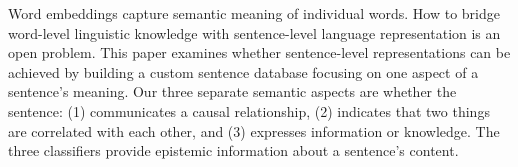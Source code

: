 Word embeddings capture semantic meaning of individual words. How to bridge word-level linguistic knowledge with sentence-level language representation is an open problem. This paper examines whether sentence-level representations can be achieved by building a custom sentence database focusing on one aspect of a sentence's meaning. Our three separate semantic aspects are whether the sentence: (1) communicates a causal relationship, (2) indicates that two things are correlated with each other, and (3) expresses information or knowledge. The three classifiers provide epistemic information about a sentence's content.
